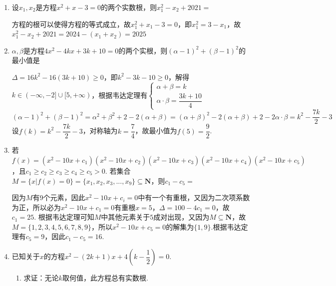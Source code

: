 \begin{enumerate}
\begin{enumerate}
\begin{jieda}
            因此有$m = -1$
        \end{jieda}
        \item 设$x_1, x_2$是方程$x^2+x-3=0$的两个实数根，则$x_1^2-x_2+2021 = $
        \begin{jieda}
            方程的根可以使得方程的等式成立，故$x_1^2+x_1-3=0$，即$x_1^2 = 3 - x_1$，故$x_1^2-x_2+2021 = 2024 - (x_1 + x_2) = 2025$
        \end{jieda}
        \item $\alpha, \beta$是方程$4x^2-4kx+3k+10 = 0$的两个实根，则$(\alpha - 1)^2 + (\beta - 1)^2$的最小值是
        \begin{jieda}
            $\Delta = 16k^2 - 16(3k+10) \geq 0$，即$k^2 - 3k - 10 \geq 0$，解得$k \in (-\infty, -2] \cup [5, +\infty)$，根据韦达定理有$\left \{ \begin{array}{l}
                 \alpha + \beta = k  \\
                 \alpha \cdot \beta = \dfrac{3k+10}{4}
            \end{array}\right .$ \\
            $(\alpha - 1)^2 + (\beta - 1)^2 = \alpha^2 + \beta^2 + 2 - 2(\alpha + \beta) = (\alpha + \beta)^2 - 2(\alpha + \beta) + 2 - 2\alpha \cdot \beta = k^2 - \dfrac{7k}{2} - 3$ \\
            设$f(k) = k^2 - \dfrac{7k}{2} - 3$，对称轴为$k = \dfrac{7}{4}$，故最小值为$f(5) = \dfrac{9}{2}$.
        \end{jieda}
        \item 若$f(x) = (x^2-10x+c_1)(x^2-10x+c_2)(x^2-10x+c_3)(x^2-10x+c_4)(x^2-10x+c_5)$，且$c_1 \geq c_2 \geq c_3 \geq c_4 \geq c_5 > 0$. 若集合$M = \{x | f(x) = 0\} = \{x_1, x_2, x_3, ...,x_9\} \subseteq \mathbf{N}$，则$c_1 - c_5 = $
        \begin{jieda}
            因为$M$有9个元素，因此$x^2-10x+c_i = 0$中有一个有重根，又因为二次项系数为正，所以必为$x^2-10x+c_1 = 0$有重根$x = 5$，$\Delta = 100 - 4c_1 = 0$，故$c_1 = 25$. 根据韦达定理可知$M$中其他元素关于$5$成对出现，又因为$M \subseteq \mathbf{N}$，故$M = \{1,2,3,4,5,6,7,8,9\}$，所以$x^2-10x+c_5 = 0$的解集为$\{1,9\}$.根据韦达定理有$c_5 = 9$，因此$c_1 - c_5 = 16$.
        \end{jieda}
        \item 已知关于$x$的方程$x^2-(2k+1)x+4\left(k-\dfrac{1}{2}\right)= 0$.
        \begin{enumerate}
            \item 求证：无论$k$取何值，此方程总有实数根.

\end{enumerate}
\end{enumerate}
\end{enumerate}
